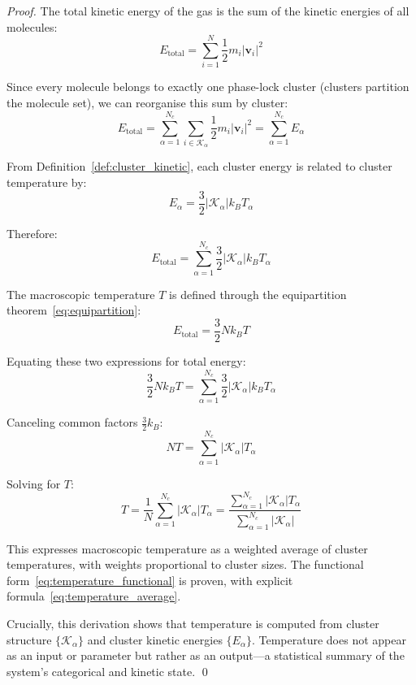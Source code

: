 \documentclass[12pt,a4paper]{article}
\theoremstyle{definition}
\theoremstyle{remark}
\begin{document}
\begin{proof}
The total kinetic energy of the gas is the sum of the kinetic energies of all molecules:
\begin{equation}
E_{\text{total}} = \sum_{i=1}^N \frac{1}{2} m_i |\mathbf{v}_i|^2
\end{equation}

Since every molecule belongs to exactly one phase-lock cluster (clusters partition the molecule set), we can reorganise this sum by cluster:
\begin{equation}
E_{\text{total}} = \sum_{\alpha=1}^{N_c} \sum_{i \in \mathcal{K}_\alpha} \frac{1}{2} m_i |\mathbf{v}_i|^2 = \sum_{\alpha=1}^{N_c} E_\alpha
\end{equation}

From Definition~\ref{def:cluster_kinetic}, each cluster energy is related to cluster temperature by:
\begin{equation}
E_\alpha = \frac{3}{2} |\mathcal{K}_\alpha| k_B T_\alpha
\end{equation}

Therefore:
\begin{equation}
E_{\text{total}} = \sum_{\alpha=1}^{N_c} \frac{3}{2} |\mathcal{K}_\alpha| k_B T_\alpha
\end{equation}

The macroscopic temperature $T$ is defined through the equipartition theorem~\eqref{eq:equipartition}:
\begin{equation}
E_{\text{total}} = \frac{3}{2} N k_B T
\end{equation}

Equating these two expressions for total energy:
\begin{equation}
\frac{3}{2} N k_B T = \sum_{\alpha=1}^{N_c} \frac{3}{2} |\mathcal{K}_\alpha| k_B T_\alpha
\end{equation}

Canceling common factors $\frac{3}{2} k_B$:
\begin{equation}
N T = \sum_{\alpha=1}^{N_c} |\mathcal{K}_\alpha| T_\alpha
\end{equation}

Solving for $T$:
\begin{equation}
T = \frac{1}{N}\sum_{\alpha=1}^{N_c} |\mathcal{K}_\alpha| T_\alpha = \frac{\sum_{\alpha=1}^{N_c} |\mathcal{K}_\alpha| T_\alpha}{\sum_{\alpha=1}^{N_c} |\mathcal{K}_\alpha|}
\end{equation}

This expresses macroscopic temperature as a weighted average of cluster temperatures, with weights proportional to cluster sizes. The functional form~\eqref{eq:temperature_functional} is proven, with explicit formula~\eqref{eq:temperature_average}.

Crucially, this derivation shows that temperature is computed from cluster structure $\{\mathcal{K}_\alpha\}$ and cluster kinetic energies $\{E_\alpha\}$. Temperature does not appear as an input or parameter but rather as an output—a statistical summary of the system's categorical and kinetic state. \qed
\end{proof}
\end{document}
